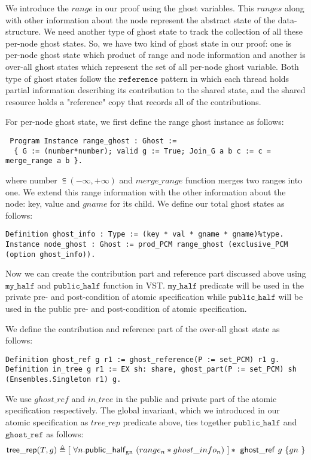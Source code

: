 \documentclass[acmsmall,screen]{acmart}\settopmatter{printfolios=true}
\begin{document}
We introduce the $range$ in our proof using the ghost variables. This $ranges$ along with other information about the node represent the abstract state of the data-structure. We need another type of ghost state to track the collection of all these per-node ghost states. So, we have two kind of ghost state in our proof: one is per-node ghost state which product of range and node information and another is over-all ghost states which represent the set of all per-node ghost variable. Both type of ghost states follow the $\texttt{reference}$ pattern in which each thread holds partial information describing its contribution to the shared state, and the shared resource holds a "reference" copy that records all of the contributions.

For per-node ghost state, we first define the range ghost instance as follows:
\begin{verbatim}
 Program Instance range_ghost : Ghost :=
  { G := (number*number); valid g := True; Join_G a b c := c =  merge_range a b }.
\end{verbatim}
where number $\subseteqq (-\infty,+\infty)$ and $merge\_range$ function merges two ranges into one. We extend this range information with the other information about the node: key, value and $gname$ for its child. We define our total ghost states as follows:
\begin{verbatim}
Definition ghost_info : Type := (key * val * gname * gname)%type.
Instance node_ghost : Ghost := prod_PCM range_ghost (exclusive_PCM (option ghost_info)).
\end{verbatim}

Now we can create the contribution part and reference part discussed above using $\texttt{my\_half}$ and $\texttt{public\_half}$ function in VST. $\texttt{my\_half}$ predicate will be used in the private pre- and post-condition of atomic specification while  $\texttt{public\_half}$ will be used in the public pre- and post-condition of atomic specification.

We define the contribution and reference part of the over-all ghost state as follows:
\begin{verbatim}
Definition ghost_ref g r1 := ghost_reference(P := set_PCM) r1 g.
Definition in_tree g r1 := EX sh: share, ghost_part(P := set_PCM) sh (Ensembles.Singleton r1) g.
\end{verbatim}
We use $ghost\_ref$ and $in\_tree$ in the public and private part of the atomic specification respectively. The global invariant, which we introduced in our atomic specification as $tree\_rep$ predicate above, ties together $\texttt{public\_half}$ and $\texttt{ghost\_ref}$ as follows:
\begin{align*}\mathsf{tree\_rep}(T,g) \triangleq [\ \forall n. \mathsf{public\_half\textsubscript{gn}} \ (range_n* ghost\_info_n)\ ] *\ \mathsf{ghost\_ref}\ g\ \{ gn\  \} \end{align*}
\end{document}
